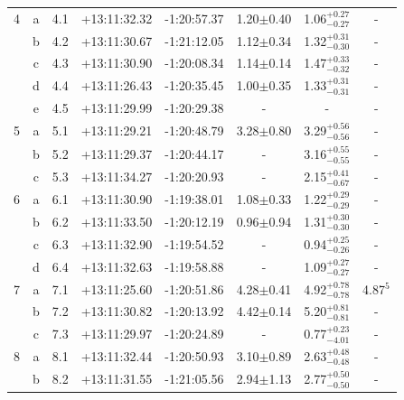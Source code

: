 \documentclass[useAMS,usenatbib]{mn2e}
\begin{document}
\begin{table}
\begin{tabular}{cccccccc}
     \hline	 						   			  					  
        4 & a &  4.1 & +13:11:32.32 & -1:20:57.37 & 1.20$\pm$0.40 & 1.06$^{+0.27}_{-0.27}$ &       -      \\
          & b &  4.2 & +13:11:30.67 & -1:21:12.05 & 1.12$\pm$0.34 & 1.32$^{+0.31}_{-0.30}$ &       -      \\
          & c &  4.3 & +13:11:30.90 & -1:20:08.34 & 1.14$\pm$0.14 & 1.47$^{+0.33}_{-0.32}$ &       -      \\
          & d &  4.4 & +13:11:26.43 & -1:20:35.45 & 1.00$\pm$0.35 & 1.33$^{+0.31}_{-0.31}$ &       -      \\
          & e &  4.5 & +13:11:29.99 & -1:20:29.38 &      -        &          -             &       -      \\
     \hline	 						   			  					  
        5 & a &  5.1 & +13:11:29.21 & -1:20:48.79 & 3.28$\pm$0.80 & 3.29$^{+0.56}_{-0.56}$ &       -      \\
          & b &  5.2 & +13:11:29.37 & -1:20:44.17 &      -        & 3.16$^{+0.55}_{-0.55}$ &       -      \\
          & c &  5.3 & +13:11:34.27 & -1:20:20.93 &      -        & 2.15$^{+0.41}_{-0.67}$ &       -      \\
     \hline	 						   			  					  
        6 & a &  6.1 & +13:11:30.90 & -1:19:38.01 & 1.08$\pm$0.33 & 1.22$^{+0.29}_{-0.29}$ &       -      \\
          & b &  6.2 & +13:11:33.50 & -1:20:12.19 & 0.96$\pm$0.94 & 1.31$^{+0.30}_{-0.30}$ &       -      \\
          & c &  6.3 & +13:11:32.90 & -1:19:54.52 &      -        & 0.94$^{+0.25}_{-0.26}$ &       -      \\
          & d &  6.4 & +13:11:32.63 & -1:19:58.88 &      -        & 1.09$^{+0.27}_{-0.27}$ &       -      \\
     \hline	 						   			  					  
        7 & a &  7.1 & +13:11:25.60 & -1:20:51.86 & 4.28$\pm$0.41 & 4.92$^{+0.78}_{-0.78}$ &  4.87$^{5}$  \\
          & b &  7.2 & +13:11:30.82 & -1:20:13.92 & 4.42$\pm$0.14 & 5.20$^{+0.81}_{-0.81}$ &       -      \\
          & c &  7.3 & +13:11:29.97 & -1:20:24.89 &      -        & 0.77$^{+0.23}_{-4.01}$ &       -      \\
     \hline	 						   			  					  
        8 & a &  8.1 & +13:11:32.44 & -1:20:50.93 & 3.10$\pm$0.89 & 2.63$^{+0.48}_{-0.48}$ &       -      \\
          & b &  8.2 & +13:11:31.55 & -1:21:05.56 & 2.94$\pm$1.13 & 2.77$^{+0.50}_{-0.50}$ &       -      \\

\end{tabular}
\end{table}
\end{document}
